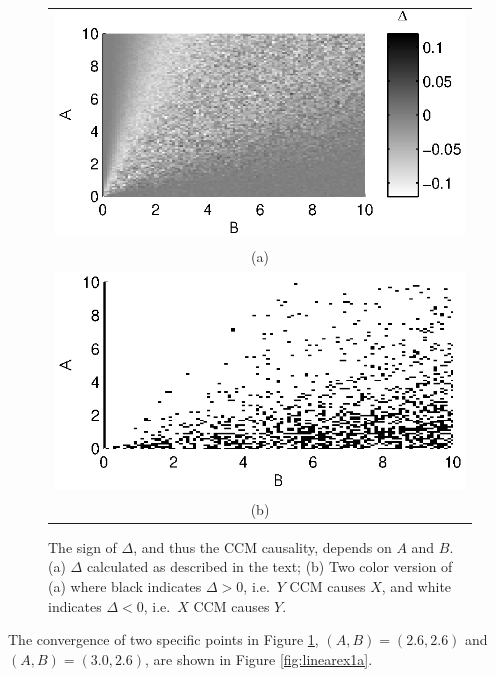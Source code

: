 \documentclass[a4paper,11pt,twocolumn]{article}
\begin{document}
\begin{figure}[ht]
\begin{tabular}[ht]{c}
\includegraphics[scale=0.9]{LinearEx.eps} \\
(a) \\
\includegraphics[scale=0.9]{LinearEx3Color.eps} \\
(b)
\end{tabular}
\caption{The sign of $\Delta$, and thus the CCM causality, depends on $A$ and $B$. (a) $\Delta$ calculated as described in the text; (b) Two color version of (a) where black indicates $\Delta>0$, i.e.\ $Y$ CCM causes $X$, and white indicates $\Delta<0$, i.e.\ $X$ CCM causes $Y$.}
\label{fig:linearex1}
\end{figure}
The convergence of two specific points in Figure \ref{fig:linearex1}, $(A,B) = (2.6,2.6)$ and $(A,B)=(3.0,2.6)$, are shown in Figure \ref{fig:linearex1a}.
\end{document}
